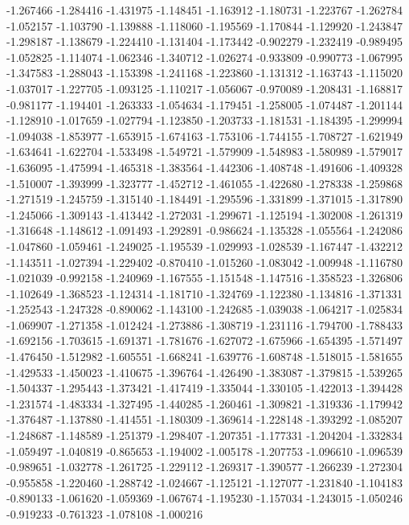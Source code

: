 -1.267466
-1.284416
-1.431975
-1.148451
-1.163912
-1.180731
-1.223767
-1.262784
-1.052157
-1.103790
-1.139888
-1.118060
-1.195569
-1.170844
-1.129920
-1.243847
-1.298187
-1.138679
-1.224410
-1.131404
-1.173442
-0.902279
-1.232419
-0.989495
-1.052825
-1.114074
-1.062346
-1.340712
-1.026274
-0.933809
-0.990773
-1.067995
-1.347583
-1.288043
-1.153398
-1.241168
-1.223860
-1.131312
-1.163743
-1.115020
-1.037017
-1.227705
-1.093125
-1.110217
-1.056067
-0.970089
-1.208431
-1.168817
-0.981177
-1.194401
-1.263333
-1.054634
-1.179451
-1.258005
-1.074487
-1.201144
-1.128910
-1.017659
-1.027794
-1.123850
-1.203733
-1.181531
-1.184395
-1.299994
-1.094038
-1.853977
-1.653915
-1.674163
-1.753106
-1.744155
-1.708727
-1.621949
-1.634641
-1.622704
-1.533498
-1.549721
-1.579909
-1.548983
-1.580989
-1.579017
-1.636095
-1.475994
-1.465318
-1.383564
-1.442306
-1.408748
-1.491606
-1.409328
-1.510007
-1.393999
-1.323777
-1.452712
-1.461055
-1.422680
-1.278338
-1.259868
-1.271519
-1.245759
-1.315140
-1.184491
-1.295596
-1.331899
-1.371015
-1.317890
-1.245066
-1.309143
-1.413442
-1.272031
-1.299671
-1.125194
-1.302008
-1.261319
-1.316648
-1.148612
-1.091493
-1.292891
-0.986624
-1.135328
-1.055564
-1.242086
-1.047860
-1.059461
-1.249025
-1.195539
-1.029993
-1.028539
-1.167447
-1.432212
-1.143511
-1.027394
-1.229402
-0.870410
-1.015260
-1.083042
-1.009948
-1.116780
-1.021039
-0.992158
-1.240969
-1.167555
-1.151548
-1.147516
-1.358523
-1.326806
-1.102649
-1.368523
-1.124314
-1.181710
-1.324769
-1.122380
-1.134816
-1.371331
-1.252543
-1.247328
-0.890062
-1.143100
-1.242685
-1.039038
-1.064217
-1.025834
-1.069907
-1.271358
-1.012424
-1.273886
-1.308719
-1.231116
-1.794700
-1.788433
-1.692156
-1.703615
-1.691371
-1.781676
-1.627072
-1.675966
-1.654395
-1.571497
-1.476450
-1.512982
-1.605551
-1.668241
-1.639776
-1.608748
-1.518015
-1.581655
-1.429533
-1.450023
-1.410675
-1.396764
-1.426490
-1.383087
-1.379815
-1.539265
-1.504337
-1.295443
-1.373421
-1.417419
-1.335044
-1.330105
-1.422013
-1.394428
-1.231574
-1.483334
-1.327495
-1.440285
-1.260461
-1.309821
-1.319336
-1.179942
-1.376487
-1.137880
-1.414551
-1.180309
-1.369614
-1.228148
-1.393292
-1.085207
-1.248687
-1.148589
-1.251379
-1.298407
-1.207351
-1.177331
-1.204204
-1.332834
-1.059497
-1.040819
-0.865653
-1.194002
-1.005178
-1.207753
-1.096610
-1.096539
-0.989651
-1.032778
-1.261725
-1.229112
-1.269317
-1.390577
-1.266239
-1.272304
-0.955858
-1.220460
-1.288742
-1.024667
-1.125121
-1.127077
-1.231840
-1.104183
-0.890133
-1.061620
-1.059369
-1.067674
-1.195230
-1.157034
-1.243015
-1.050246
-0.919233
-0.761323
-1.078108
-1.000216
